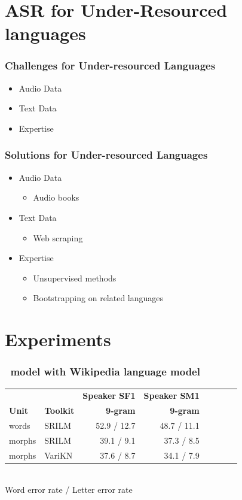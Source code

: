 \section[Under-resourced]{ASR for Under-Resourced languages}
\begin{frame}
\frametitle{Challenges for Under-resourced Languages}
\begin{itemize}
\item Audio Data
\item Text Data
\item Expertise
\end{itemize}
\end{frame}
%

\begin{frame}
\frametitle{Solutions for Under-resourced Languages}
\begin{itemize}
\item Audio Data
\begin{itemize}
\item Audio books
\end{itemize}
\item Text Data
\begin{itemize}
\item Web scraping
\end{itemize}
\item Expertise
\begin{itemize}
\item Unsupervised methods
\item Bootstrapping on related languages
\end{itemize}
\end{itemize}
\end{frame}

\section{Experiments}
\begin{frame}
\frametitle{\ns\ model with Wikipedia language model}

\begin{tabular}{ll|rrr|rrr}
& & \textbf{Speaker SF1} & \textbf{Speaker SM1} \\
 \textbf{Unit} & \textbf{Toolkit} & \textbf{9-gram} & \textbf{9-gram}\\\hline
 words & SRILM & 52.9 / 12.7&  48.7 / 11.1\\
morphs & SRILM & 39.1 / 9.1 &  37.3 / 8.5 \\
 morphs & VariKN   & 37.6 / 8.7 & 34.1 / 7.9 \\

\end{tabular}
\\[1cm]
Word error rate / Letter error rate\\
\end{frame}

